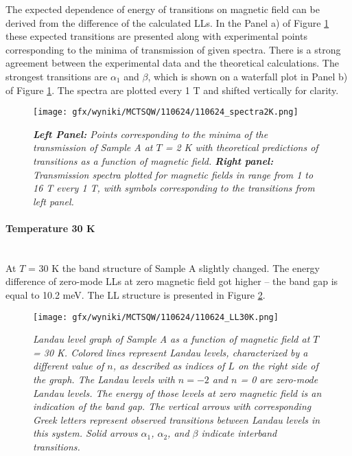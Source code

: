 \documentclass[titlepage,a4paper]{book}
\newcommand{\wciecie}{\quad\phantom{v}}
\newcommand{\myparagraph}[1]{\paragraph{#1}\mbox{}\\}
\begin{document}
The expected dependence of energy of transitions on magnetic field can be derived from the difference of the calculated LLs. In the Panel a) of Figure \ref{fig:Spectra_110624_2K} these expected transitions are presented along with experimental points corresponding to the minima of transmission of given spectra. There is a strong agreement between the experimental data and the theoretical calculations. The strongest transitions are $\alpha_1$ and $\beta$, which is shown on a waterfall plot in Panel b) of Figure \ref{fig:Spectra_110624_2K}. The spectra are plotted every 1 T and shifted vertically for clarity.

\begin{figure}[H]
	\centering
	\texttt{[image: gfx/wyniki/MCTSQW/110624/110624\_spectra2K.png]}
	\vspace{-10pt}
	\caption{\textit{\textbf{Left Panel:} Points corresponding to the minima of the transmission of Sample A at $T$ = 2 K with theoretical predictions of transitions as a function of magnetic field. \textbf{Right panel:} Transmission spectra plotted for magnetic fields in range from 1 to 16 T every 1 T, with symbols corresponding to the transitions from left panel.}}
	\label{fig:Spectra_110624_2K}
\end{figure}

\clearpage
\myparagraph{Temperature 30 K}
\wciecie
At $T$ = 30 K the band structure of Sample A slightly changed. The energy difference of zero-mode LLs at zero magnetic field got higher -- the band gap is equal to 10.2 meV. The LL structure is presented in Figure \ref{fig:LL_110624_30K}.

\begin{figure}[ht]
	\centering
	\texttt{[image: gfx/wyniki/MCTSQW/110624/110624\_LL30K.png]}
	\vspace{-10pt}
	\caption{\textit{Landau level graph of Sample A as a function of magnetic field at $T$ = 30 K. Colored lines represent Landau levels, characterized by a different value of $n$, as described as indices of $L$ on the right side of the graph. The Landau levels with $n = -2$ and $n$ = 0 are zero-mode Landau levels. The energy of those levels at zero magnetic field is an indication of the band gap. The vertical arrows with corresponding Greek letters represent observed transitions between Landau levels in this system. Solid arrows $\alpha_1$, $\alpha_2$, and $\beta$ indicate interband transitions.}}
	\label{fig:LL_110624_30K}
\end{figure}
\end{document}
